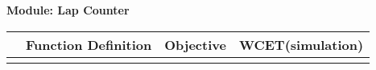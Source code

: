\documentclass{article}
\begin{document}
{\huge\textbf {Module: Lap Counter}}

\begin{tabular}{| c | C{4cm} | C{4cm} | C{4cm} |}
\hline
&\textbf{Function Definition}  & \textbf{Objective} &\textbf{WCET(simulation)}\\
\hline
&&&\\


\hline
\hline
\end{tabular}
\end{document}
